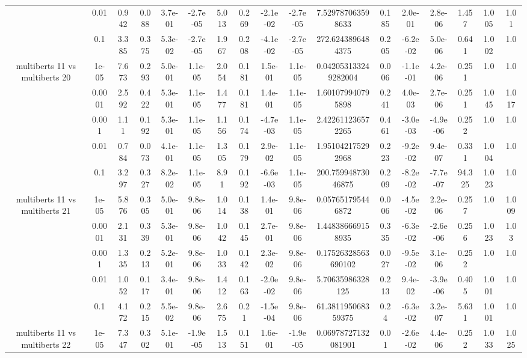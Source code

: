 \begin{tabular}{|c|c|c|c|c|c|c|c|c|c|c|c|c|c|c|c|c|}
 & 0.01 & 0.942 & 0.088 & 3.7e-01 & -2.7e-05 & 5.013 & 0.269 & -2.1e-02 & -2.7e-05 & 7.529787063598633 & 0.185 & 2.0e-01 & 2.8e-06 & 1.457 & 1.005 & 1.01 \\
 & 0.1 & 3.385 & 0.375 & 5.3e-02 & -2.7e-05 & 1.967 & 0.208 & -4.1e-02 & -2.7e-05 & 272.6243896484375 & 0.205 & -6.2e-02 & 5.0e-06 & 0.641 & 1.002 & 1.0 \\
\hline
\multirow{5}{*}{multiberts 11 vs multiberts 20} & 1e-05 & 7.673 & 0.293 & 5.0e-01 & 1.1e-05 & 2.054 & 0.181 & 1.5e-01 & 1.1e-05 & 0.042053133249282004 & 0.006 & -1.1e-01 & 4.2e-06 & 0.251 & 1.0 & 1.0 \\
 & 0.0001 & 2.592 & 0.422 & 5.3e-01 & 1.1e-05 & 1.477 & 0.181 & 1.4e-01 & 1.1e-05 & 1.601079940795898 & 0.241 & 4.0e-03 & 2.7e-06 & 0.251 & 1.045 & 1.017 \\
 & 0.001 & 1.11 & 0.192 & 5.3e-01 & 1.1e-05 & 1.156 & 0.174 & -4.7e-03 & 1.1e-05 & 2.422611236572265 & 0.461 & -3.0e-03 & -4.9e-06 & 0.252 & 1.0 & 1.0 \\
 & 0.01 & 0.784 & 0.073 & 4.1e-01 & 1.1e-05 & 1.305 & 0.179 & 2.9e-02 & 1.1e-05 & 1.951042175292968 & 0.223 & -9.2e-02 & 9.4e-07 & 0.331 & 1.004 & 1.0 \\
 & 0.1 & 3.297 & 0.327 & 8.2e-02 & 1.1e-05 & 8.91 & 0.192 & -6.6e-03 & 1.1e-05 & 200.75994873046875 & 0.209 & -8.2e-02 & -7.7e-07 & 94.325 & 1.023 & 1.0 \\
\hline
\multirow{5}{*}{multiberts 11 vs multiberts 21} & 1e-05 & 5.876 & 0.305 & 5.0e-01 & 9.8e-06 & 1.014 & 0.138 & 1.4e-01 & 9.8e-06 & 0.057651795446872 & 0.006 & -4.5e-02 & 2.2e-06 & 0.257 & 1.0 & 1.009 \\
 & 0.0001 & 2.131 & 0.339 & 5.3e-01 & 9.8e-06 & 1.042 & 0.145 & 2.7e-01 & 9.8e-06 & 1.448386669158935 & 0.335 & -6.3e-02 & -2.6e-06 & 0.256 & 1.023 & 1.03 \\
 & 0.001 & 1.335 & 0.213 & 5.2e-01 & 9.8e-06 & 1.033 & 0.142 & 2.3e-02 & 9.8e-06 & 0.17526328563690102 & 0.027 & -9.5e-02 & 3.1e-06 & 0.252 & 1.0 & 1.0 \\
 & 0.01 & 1.052 & 0.117 & 3.4e-01 & 9.8e-06 & 1.412 & 0.163 & -2.0e-02 & 9.8e-06 & 5.70635986328125 & 0.213 & 9.4e-02 & -3.9e-06 & 0.405 & 1.001 & 1.0 \\
 & 0.1 & 4.172 & 0.215 & 5.5e-02 & 9.8e-06 & 2.675 & 0.21 & -1.5e-04 & 9.8e-06 & 61.381195068359375 & 0.24 & -6.3e-02 & 3.2e-07 & 5.631 & 1.001 & 1.0 \\
\hline
\multirow{5}{*}{multiberts 11 vs multiberts 22} & 1e-05 & 7.347 & 0.302 & 5.1e-01 & -1.9e-05 & 1.513 & 0.151 & 1.6e-01 & -1.9e-05 & 0.06978727132081901 & 0.01 & -2.6e-02 & 4.4e-06 & 0.252 & 1.033 & 1.025 \\

\end{tabular}
